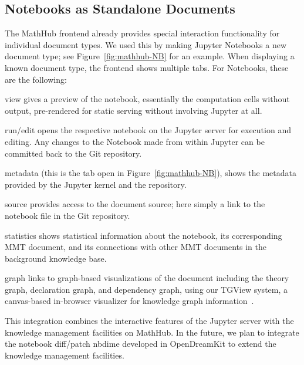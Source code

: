 \begin{oldpart}
\subsection{Notebooks as Standalone Documents}

The MathHub frontend already provides special interaction functionality for individual document types.
We used this by making Jupyter Notebooks a new document type; see Figure~\ref{fig:mathhub-NB} for an example.
When displaying a known document type, the frontend shows multiple tabs.
For Notebooks, these are the following:
\begin{compactenum}[\em i\rm)]
\item \textsf{view} gives a preview of the notebook, essentially the computation cells without output, pre-rendered for static serving without involving Jupyter at all. 
\item \textsf{run/edit} opens the respective notebook on the Jupyter server for execution and editing.
Any changes to the Notebook made from within Jupyter can be committed back to the Git repository. 
\item \textsf{metadata} (this is the tab open in Figure~\ref{fig:mathhub-NB}), shows the metadata provided by the Jupyter kernel and the repository. 
\item \textsf{source} provides access to the document source; here simply a link to the notebook file in the Git repository.
\item \textsf{statistics} shows statistical information about the notebook, its corresponding MMT document, and its connections with other MMT documents in the background knowledge base.
\item \textsf{graph} links to graph-based visualizations of the document including the theory graph, declaration graph, and dependency graph, using our TGView system, a canvas-based in-browser visualizer for knowledge graph information~\cite{RupKohMue:fitgv17}.
\end{compactenum}
This integration combines the interactive features of the Jupyter server with the knowledge management facilities on MathHub. In the future, we plan to integrate the notebook diff/patch \textsf{nbdime} developed in OpenDreamKit to extend the knowledge management facilities. 


\end{oldpart}
